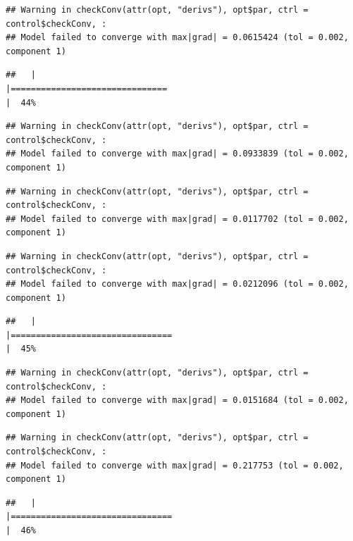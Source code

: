 \documentclass[
  12pt,
]{book}
\begin{document}
\begin{verbatim}
## Warning in checkConv(attr(opt, "derivs"), opt$par, ctrl = control$checkConv, :
## Model failed to converge with max|grad| = 0.0615424 (tol = 0.002, component 1)
\end{verbatim}

\begin{verbatim}
##   |                                                                              |===============================                                       |  44%
\end{verbatim}

\begin{verbatim}
## Warning in checkConv(attr(opt, "derivs"), opt$par, ctrl = control$checkConv, :
## Model failed to converge with max|grad| = 0.0933839 (tol = 0.002, component 1)
\end{verbatim}

\begin{verbatim}
## Warning in checkConv(attr(opt, "derivs"), opt$par, ctrl = control$checkConv, :
## Model failed to converge with max|grad| = 0.0117702 (tol = 0.002, component 1)
\end{verbatim}

\begin{verbatim}
## Warning in checkConv(attr(opt, "derivs"), opt$par, ctrl = control$checkConv, :
## Model failed to converge with max|grad| = 0.0212096 (tol = 0.002, component 1)
\end{verbatim}

\begin{verbatim}
##   |                                                                              |================================                                      |  45%
\end{verbatim}

\begin{verbatim}
## Warning in checkConv(attr(opt, "derivs"), opt$par, ctrl = control$checkConv, :
## Model failed to converge with max|grad| = 0.0151684 (tol = 0.002, component 1)
\end{verbatim}

\begin{verbatim}
## Warning in checkConv(attr(opt, "derivs"), opt$par, ctrl = control$checkConv, :
## Model failed to converge with max|grad| = 0.217753 (tol = 0.002, component 1)
\end{verbatim}

\begin{verbatim}
##   |                                                                              |================================                                      |  46%
\end{verbatim}
\end{document}
